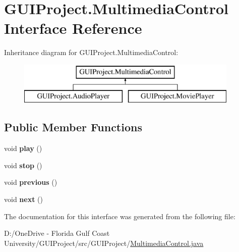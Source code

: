 \hypertarget{interface_g_u_i_project_1_1_multimedia_control}{}\section{G\+U\+I\+Project.\+Multimedia\+Control Interface Reference}
\label{interface_g_u_i_project_1_1_multimedia_control}
Inheritance diagram for G\+U\+I\+Project.\+Multimedia\+Control\+:\begin{figure}[H]
\begin{center}
\leavevmode
\includegraphics[height=2.000000cm]{interface_g_u_i_project_1_1_multimedia_control}
\end{center}
\end{figure}
\subsection*{Public Member Functions}
\begin{DoxyCompactItemize}
\item 
\mbox{\label{interface_g_u_i_project_1_1_multimedia_control_afb58391c92c89b9d0d2a963ffc0e7bd5}} 
void {\bfseries play} ()
\item 
\mbox{\label{interface_g_u_i_project_1_1_multimedia_control_a43f596f97d14452b61c92099b7708a3c}} 
void {\bfseries stop} ()
\item 
\mbox{\label{interface_g_u_i_project_1_1_multimedia_control_a8e62201a3b3808c9222507252c0922cd}} 
void {\bfseries previous} ()
\item 
\mbox{\label{interface_g_u_i_project_1_1_multimedia_control_a16fa6151e900cee7c766741026d516f1}} 
void {\bfseries next} ()
\end{DoxyCompactItemize}


The documentation for this interface was generated from the following file\+:\begin{DoxyCompactItemize}
\item 
D\+:/\+One\+Drive -\/ Florida Gulf Coast University/\+G\+U\+I\+Project/src/\+G\+U\+I\+Project/\mbox{\hyperlink{_multimedia_control_8java}{Multimedia\+Control.\+java}}\end{DoxyCompactItemize}

